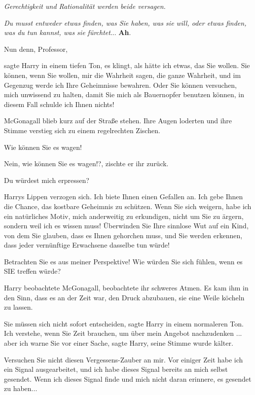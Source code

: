 \emph{Gerechtigkeit und Rationalität werden beide versagen.}

\emph{Du musst entweder etwas finden, was Sie haben, was sie will, oder etwas
finden, was du tun kannst, was sie fürchtet}... \textbf{Ah}.

\glqq{}Nun denn, Professor\grqq{},

sagte Harry in einem tiefen Ton, \glqq{}es klingt, als hätte ich etwas, das Sie
wollen. Sie können, wenn Sie wollen, mir die Wahrheit sagen, die ganze Wahrheit,
und im Gegenzug werde ich Ihre Geheimnisse bewahren. Oder Sie können versuchen,
mich unwissend zu halten, damit Sie mich als Bauernopfer benutzen können, in
diesem Fall schulde ich Ihnen nichts!\grqq{}

McGonagall blieb kurz auf der Straße stehen. Ihre Augen loderten und ihre Stimme
verstieg sich zu einem regelrechten Zischen.

\glqq{}Wie können Sie es wagen!\grqq{}

\glqq{}Nein, wie können Sie es wagen!?\grqq{}, zischte er ihr zurück.

\glqq{}Du würdest mich erpressen?\grqq{}

Harrys Lippen verzogen sich. \glqq{}Ich biete Ihnen einen Gefallen an. Ich gebe
Ihnen die Chance, das kostbare Geheimnis zu schützen. Wenn Sie sich weigern,
habe ich ein natürliches Motiv, mich anderweitig zu erkundigen, nicht um Sie zu
ärgern, sondern weil ich es wissen muss! Überwinden Sie Ihre sinnlose Wut auf
ein Kind, von dem Sie glauben, dass es Ihnen gehorchen muss, und Sie werden
erkennen, dass jeder vernünftige Erwachsene dasselbe tun würde!

Betrachten Sie es aus meiner Perspektive! Wie würden Sie sich fühlen, wenn es
SIE treffen würde?\grqq{}

Harry beobachtete McGonagall, beobachtete ihr schweres Atmen. Es kam ihm in den
Sinn, dass es an der Zeit war, den Druck abzubauen, sie eine Weile köcheln zu
lassen.

\glqq{}Sie müssen sich nicht sofort entscheiden\grqq{}, sagte Harry in einem
normaleren Ton. \glqq{}Ich verstehe, wenn Sie Zeit brauchen, um über mein
Angebot nachzudenken ... aber ich warne Sie vor einer Sache\grqq{}, sagte Harry,
seine Stimme wurde kälter.

\glqq{}Versuchen Sie nicht diesen Vergessens-Zauber an mir. Vor einiger Zeit
habe ich ein Signal ausgearbeitet, und ich habe dieses Signal bereits an mich
selbst gesendet. Wenn ich dieses Signal finde und mich nicht daran erinnere, es
gesendet zu haben...\grqq{}

